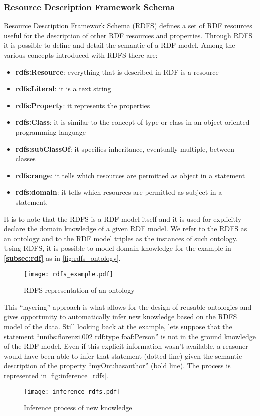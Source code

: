 \subsubsection{Resource Description Framework Schema}
Resource Description Framework Schema (RDFS) defines a set of RDF resources useful for the description of other RDF resources and properties. Through RDFS it is possible to define and detail the semantic of a RDF model. Among the various concepts introduced with RDFS there are:
\begin{itemize}
  \item \textbf{rdfs:Resource}: everything that is described in RDF is a resource
  \item \textbf{rdfs:Literal}: it is a text string
  \item \textbf{rdfs:Property}: it represents the properties
  \item \textbf{rdfs:Class}: it is similar to the concept of type or class in an object oriented programming language
  \item \textbf{rdfs:subClassOf}: it specifies inheritance, eventually multiple, between classes
  \item \textbf{rdfs:range}: it tells which resources are permitted as object in a statement
  \item \textbf{rdfs:domain}: it tells which resources are permitted as subject in a statement.
\end{itemize}
It is to note that the RDFS is a RDF model itself and it is used for explicitly declare the domain knowledge of a given RDF model. We refer to the RDFS as an ontology and to the RDF model triples as the instances of such ontology.
Using RDFS, it is possible to model domain knowledge for the example in \textbf{\autoref{subsec:rdf}} as in \autoref{fig:rdfs_ontology}.
\begin{figure}
  \centering
  \texttt{[image: rdfs\_example.pdf]}
  \caption{RDFS representation of an ontology}
  \label{fig:rdfs_ontology}
\end{figure}
This ``layering'' approach is what allows for the design of reusable ontologies and gives opportunity to automatically infer new knowledge based on the RDFS model of the data.
Still looking back at the example, lets suppose that the statement ``unibs:florenzi.002 rdf:type foaf:Person'' is not in the ground knowledge of the RDF model. Even if this explicit information wasn't available, a reasoner would have been able to infer that statement (dotted line) given the semantic description of the property ``myOnt:has\textunderscore author'' (bold line). The process is represented in \autoref{fig:inference_rdfs}.
\begin{figure}
  \centering
  \texttt{[image: inference\_rdfs.pdf]}
  \caption{Inference process of new knowledge}
  \label{fig:inference_rdfs}
\end{figure}
